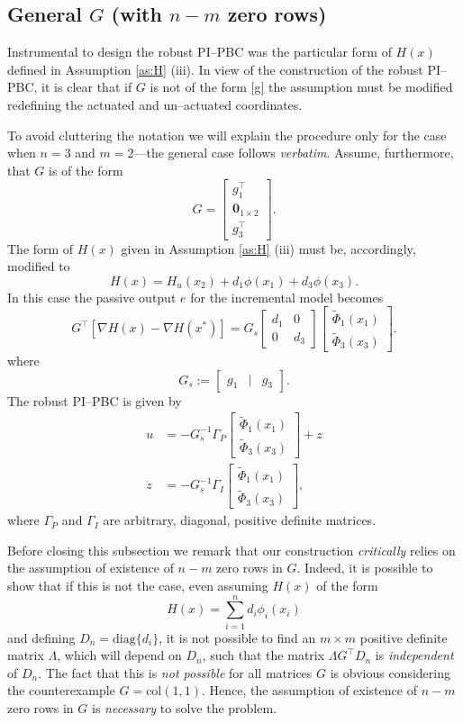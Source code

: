\documentclass[10pt, conference]{ieeeconf}
\newcommand{\col}{ \mbox{col} }
\def\diag{\mbox{diag}}
\def\lab{\label}
\def\lef[{\left[\begin{array}}
	\def\rig]{\end{array}\right]}
\begin{document}
\subsection{General $G$ (with $n-m$ zero rows)}
\lab{subsec51}	


Instrumental to design the robust PI--PBC was the particular form of $H(x)$ defined in Assumption \ref{as:H} (iii). In view of the construction of the robust PI--PBC, it is clear that if $G$ is not of the form  \eqref{g} the assumption must be modified redefining the actuated and un--actuated coordinates. 

To avoid cluttering the notation we will explain the procedure only for the case when $n=3$ and $m=2$---the general case follows {\em verbatim}. Assume, furthermore, that $G$ is of the form
$$
G=\lef[{c} g_1^\top \\ \mathbf{0}_{1 \times 2} \\  g_3^\top \rig].
$$
The form of $H(x)$ given in Assumption \ref{as:H} (iii) must be, accordingly, modified to
$$
H(x)=H_u(x_2)+d_1 \phi(x_1) + d_3 \phi(x_3).
$$
In this case the passive output $e$ for the incremental model becomes
$$
G^\top [\nabla H(x)-\nabla H(x^*)]=G_s \lef[{cc} d_1 & 0 \\ 0 & d_3 \rig] \lef[{c} \widetilde{\Phi}_1(x_1) \\  \widetilde{\Phi}_3(x_3) \rig].
$$
where
$$
G_s:= \lef[{ccc} g_1& | & g_3 \rig].
$$
The robust PI--PBC is given by
\begin{equation*}
	\begin{aligned}
		u &= - G_s^{-1} \Gamma_P \lef[{c} \widetilde{\Phi}_1(x_1) \\  \widetilde{\Phi}_3(x_3) \rig] + z \\
		\dot{z} &=  - G_s^{-1} \Gamma_I \lef[{c} \widetilde{\Phi}_1(x_1) \\  \widetilde{\Phi}_3(x_3) \rig],
	\end{aligned}
\end{equation*}
where $\Gamma_P$ and $\Gamma_I$ are arbitrary, diagonal, positive definite matrices.


Before closing this subsection we remark that our construction {\em critically} relies on the assumption of existence of $n-m$ zero rows in $G$. Indeed, it is possible to show that if this is not the case, even assuming $H(x)$ of the form
$$
H(x)=\sum_{i=1}^n d_i \phi_i(x_i)
$$
and defining $D_n = \diag\{d_i\}$, it is not possible to find an $m \times m$ positive definite matrix $\Lambda$, which will depend on $D_n$, such that the matrix $\Lambda G^\top D_n$ is {\em independent} of $D_n$. The fact that this is {\em not possible} for all matrices $G$ is obvious considering the counterexample $G=\col(1,1)$. Hence, the assumption of existence of $n-m$ zero rows in $G$ is {\em necessary} to solve the problem. 
\end{document}
